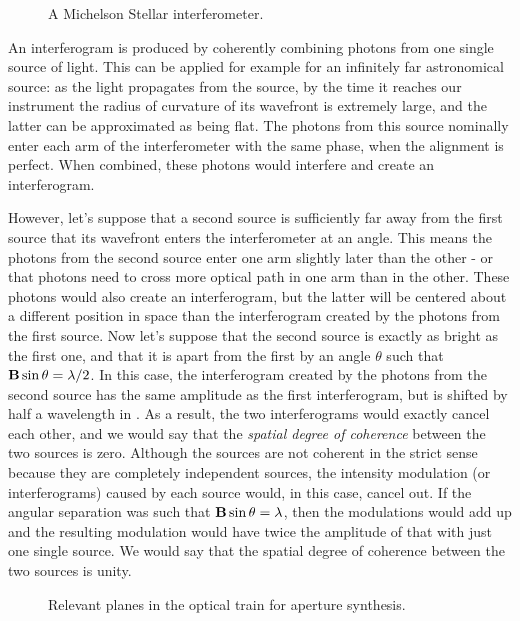 \begin{figure}[!h]
	\centering
	
	\caption[Michelson Stellar interferometer]{A Michelson Stellar interferometer.}
	\label{fig:interferometer}
    \end{figure}


An interferogram is produced by coherently combining photons from one single source of light. This can be applied for example for an infinitely far astronomical source: as the light propagates from the source, by the time it reaches our instrument the radius of curvature of its wavefront is extremely large, and the latter can be approximated as being flat. The photons from this source nominally enter each arm of the interferometer with the same phase, when the alignment is perfect. When combined, these photons would interfere and create an interferogram.




However, let's suppose that a second source is sufficiently far away from the first source that its wavefront enters the interferometer at an angle. This means the photons from the second source enter one arm slightly later than the other - or that photons need to cross more optical path in one arm than in the other. These photons would also create an interferogram, but the latter will be centered about a different position in \OPD  space than the interferogram created by the photons from the first source. Now let's suppose that the second source is exactly as bright as the first one, and that it is apart from the first by an angle $\theta$ such that $\mathbf{B}\sin\theta = \lambda/2$. In this case,  the interferogram created by the photons from the second source has the same amplitude as the first interferogram, but is shifted by half a wavelength in \OPD. As a result, the two interferograms would exactly cancel each other, and we would say that the \textit{spatial degree of coherence} between the two sources is zero. Although the sources are not coherent in the strict sense because they are completely independent sources, the intensity modulation (or interferograms) caused by each source would, in this case, cancel out. If the angular separation was such that $\mathbf{B}\sin\theta = \lambda$, then the modulations would add up and the resulting modulation would have twice the amplitude of that with just one single source. We would say that the spatial degree of coherence between the two sources is unity. 

\begin{figure}[!h]
	\centering
	
	\caption[Aperture synthesis]{Relevant planes in the optical train for aperture synthesis.}
	\label{fig:aperturesynthesis}
    \end{figure}



